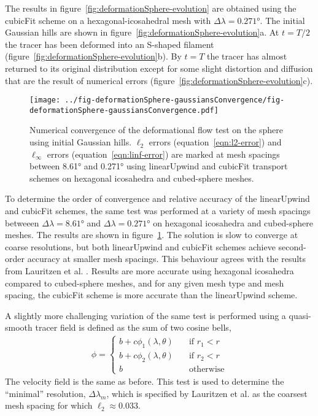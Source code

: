 The results in figure~\ref{fig:deformationSphere-evolution} are obtained using the cubicFit scheme on a hexagonal-icosahedral mesh with $\Delta \lambda = \ang{0.271}$.  The initial Gaussian hills are shown in figure~\ref{fig:deformationSphere-evolution}a.  At $t=T/2$ the tracer has been deformed into an S-shaped filament (figure~\ref{fig:deformationSphere-evolution}b).  By $t=T$ the tracer has almost returned to its original distribution except for some slight distortion and diffusion that are the result of numerical errors (figure~\ref{fig:deformationSphere-evolution}c).

\begin{figure}
	\centering
	\texttt{[image: ../fig-deformationSphere-gaussiansConvergence/fig-deformationSphere-gaussiansConvergence.pdf]}
%
	\caption{Numerical convergence of the deformational flow test on the sphere using initial Gaussian hills.  $\ell_2$ errors (equation~\ref{eqn:l2-error}) and $\ell_\infty$ errors (equation~\ref{eqn:linf-error}) are marked at mesh spacings between \ang{8.61} and \ang{0.271} using linearUpwind and cubicFit transport schemes on hexagonal icosahedra and cubed-sphere meshes.}
	\label{fig:deformationSphere-gaussian-convergence}
\end{figure}

To determine the order of convergence and relative accuracy of the linearUpwind and cubicFit schemes, the same test was performed at a variety of mesh spacings betweeen $\Delta \lambda = \ang{8.61}$ and $\Delta \lambda = \ang{0.271}$ on hexagonal icosahedra and cubed-sphere meshes.  The results are shown in figure~\ref{fig:deformationSphere-gaussian-convergence}.
The solution is slow to converge at coarse resolutions, but both linearUpwind and cubicFit schemes achieve second-order accuracy at smaller mesh spacings.  This behaviour agrees with the results from Lauritzen et al. \citep{lauritzen2012}.
Results are more accurate using hexagonal icosahedra compared to cubed-sphere meshes, and for any given mesh type and mesh spacing, the cubicFit scheme is more accurate than the linearUpwind scheme.

A slightly more challenging variation of the same test is performed using a quasi-smooth tracer field is defined as the sum of two cosine bells,
\begin{align}
	\phi =
	\begin{cases}
		b + c \phi_1(\lambda, \theta) & \quad \text{if $r_1 < r$} \\
		b + c \phi_2(\lambda, \theta) & \quad \text{if $r_2 < r$} \\
		b			      & \quad \text{otherwise}
	\end{cases}
\end{align}
The velocity field is the same as before.  This test is used to determine the ``minimal'' resolution, $\Delta \lambda_m$, which is specified by Lauritzen et al. \citep{lauritzen2012} as the coarsest mesh spacing for which $\ell_2 \approx 0.033$.

